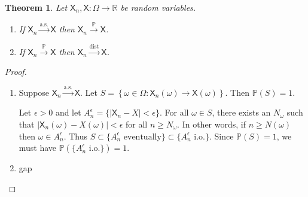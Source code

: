 \documentclass[11pt]{article}
\newcommand{\rv}[1]{\mathsf{#1}}
\newcommand{\p}{\mathbb{P}}
\newcommand{\asto}{\xrightarrow{\text{a.s.}}}
\newcommand{\pto}{\xrightarrow{\p}}
\newcommand{\disto}{\xrightarrow{\text{dist}}}
\newcommand{\RR}{\mathbb{R}}
\theoremstyle{theorem}
\newtheorem{theorem}{Theorem}[section]
\theoremstyle{definition}
\theoremstyle{remark}
\theoremstyle{step}
\theoremstyle{gap}
\begin{document}
\begin{theorem}
Let \(\rv{X}_n, \rv{X} : \Omega\to \RR\) be random variables.
\begin{enumerate}
\item
If \(\rv{X}_n \asto \rv{X}\) then \(\rv{X}_n \pto \rv{X}\).
\item
If \(\rv{X}_n \pto \rv{X}\) then \(\rv{X}_n \disto \rv{X}\).
\end{enumerate}
\end{theorem}

\begin{proof}\ 
\begin{enumerate}
\item
Suppose \(\rv{X}_n \asto \rv{X}\). Let \(S = \left\{\omega \in \Omega : \rv{X}_n(\omega) \to \rv{X}(\omega)\right\}\). Then \(\p(S) = 1\). 

Let \(\epsilon > 0\) and let \(A_n^\epsilon = \{|\rv{X}_n-X| < \epsilon\}\). For all \(\omega \in S\), there exists an \(N_\omega\) such that \(|\rv{X}_n(\omega) - X(\omega)| < \epsilon\) for all \(n \geq N_\omega\). In other words, if \(n \geq N(\omega)\) then \(\omega \in A_n^\epsilon\). Thus \(S \subset \{A_n^\epsilon \text{ eventually}\} \subset \{A_n^\epsilon \text{ i.o.}\}\). Since \(\p(S) = 1\), we must have \(\p\left(\{A_n^\epsilon \text{ i.o.}\}\right) = 1\).


%
%


\item
gap
\end{enumerate}
\end{proof}
\end{document}
